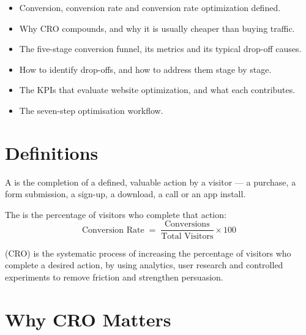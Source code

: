 \documentclass{MMTextbook}
\begin{document}

\begin{learningoutcomes}
\begin{itemize}
\item Conversion, conversion rate and conversion rate optimization defined.
\item Why CRO compounds, and why it is usually cheaper than buying traffic.
\item The five-stage conversion funnel, its metrics and its typical drop-off
      causes.
\item How to identify drop-offs, and how to address them stage by stage.
\item The KPIs that evaluate website optimization, and what each contributes.
\item The seven-step optimisation workflow.
\end{itemize}
\end{learningoutcomes}

\section{Definitions}

\begin{definitionbox}
A  is the completion of a defined, valuable action by a
visitor --- a purchase, a form submission, a sign-up, a download, a call or an app
install.

\smallskip
The  is the percentage of visitors who
complete that action:
\[ \text{Conversion Rate} \;=\; \frac{\text{Conversions}}{\text{Total Visitors}}
   \times 100 \]

 (CRO) is
the systematic process of increasing the percentage of visitors who complete a
desired action, by using analytics, user research and controlled experiments to
remove friction and strengthen persuasion.
\end{definitionbox}

\section{Why CRO Matters}
\end{document}
